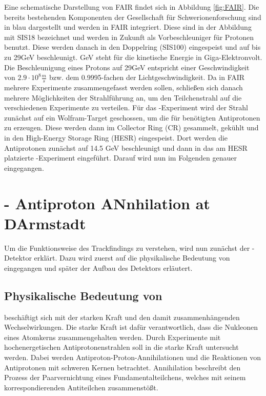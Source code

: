 Eine schematische Darstellung von FAIR findet sich in Abbildung \ref{fig:FAIR}. Die bereits bestehenden Komponenten der Gesellschaft für Schwerionenforschung sind in blau dargestellt und werden in FAIR integriert. Diese sind in der Abbildung mit SIS18 bezeichnet und werden in Zukunft als Vorbeschleuniger für Protonen benutzt. Diese werden danach in den Doppelring (SIS100) eingespeist und auf bis zu 29GeV beschleunigt. GeV steht für die kinetische Energie in Giga-Elektronvolt. Die Beschleunigung eines Protons auf 29GeV entspricht einer Geschwindigkeit von $2.9\cdot10^8\frac{m}{s}$ bzw. dem 0.9995-fachen der Lichtgeschwindigkeit. Da in FAIR mehrere Experimente zusammengefasst werden sollen, schließen sich danach mehrere Möglichkeiten der Strahlführung an, um den Teilchenstrahl auf die verschiedenen Experimente zu verteilen. Für das \pnd{}-Experiment wird der Strahl zunächst auf ein Wolfram-Target geschossen, um die für \pnd{} benötigten Antiprotonen zu erzeugen. Diese werden dann im Collector Ring (CR) gesammelt, gekühlt und in den High-Energy Storage Ring (HESR) eingespeist. Dort werden die Antiprotonen zunächst auf 14.5 GeV beschleunigt und dann in das am HESR platzierte \pnd{}-Experiment eingeführt. Darauf wird nun im Folgenden genauer eingegangen. \cite[S. 5]{MasterJette}



\section{\pnd{} - Antiproton ANnhilation at DArmstadt}
\label{sec:Panda}
Um die Funktionsweise des Trackfindings zu verstehen, wird nun zunächst der \pnd{}-Detektor erklärt. Dazu wird zuerst auf die physikalische Bedeutung von \pnd{} eingegangen und später der Aufbau des Detektors erläutert.

\subsection{Physikalische Bedeutung von \pnd{}}
\pnd{} beschäftigt sich mit der starken Kraft und den damit zusammenhängenden Wechselwirkungen. Die starke Kraft ist dafür verantwortlich, dass die Nukleonen eines Atomkerns zusammengehalten werden. Durch Experimente mit hochenergetischen Antiprotonenstrahlen soll in \pnd{} die starke Kraft untersucht werden. Dabei werden Antiproton-Proton-Annihilationen und die Reaktionen von Antiprotonen mit schweren Kernen betrachtet. Annihilation beschreibt den Prozess der Paarvernichtung eines Fundamentalteilchens, welches mit seinem korrespondierenden Antiteilchen zusammenstößt. 
\cite[S. 5]{MasterJette} 

